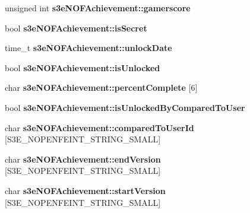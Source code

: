 \begin{DoxyCompactItemize}
\item 
\hypertarget{group___n_open_feint_api_group_ga36870064effddc6b2ff169dccd47c107}{
unsigned int {\bfseries s3eNOFAchievement::gamerscore}}
\label{group___n_open_feint_api_group_ga36870064effddc6b2ff169dccd47c107}

\item 
\hypertarget{group___n_open_feint_api_group_gabcaf8a16c837646fd6f9da16cfcefc84}{
bool {\bfseries s3eNOFAchievement::isSecret}}
\label{group___n_open_feint_api_group_gabcaf8a16c837646fd6f9da16cfcefc84}

\item 
\hypertarget{group___n_open_feint_api_group_gacc567fef5f47b21d3b268f9e8146d519}{
time\_\-t {\bfseries s3eNOFAchievement::unlockDate}}
\label{group___n_open_feint_api_group_gacc567fef5f47b21d3b268f9e8146d519}

\item 
\hypertarget{group___n_open_feint_api_group_gaf6820f91c7ca33cae0a1fc72ce166fd2}{
bool {\bfseries s3eNOFAchievement::isUnlocked}}
\label{group___n_open_feint_api_group_gaf6820f91c7ca33cae0a1fc72ce166fd2}

\item 
\hypertarget{group___n_open_feint_api_group_gad499493f971fe5430d6a06b5c70ba9d4}{
char {\bfseries s3eNOFAchievement::percentComplete} \mbox{[}6\mbox{]}}
\label{group___n_open_feint_api_group_gad499493f971fe5430d6a06b5c70ba9d4}

\item 
\hypertarget{group___n_open_feint_api_group_ga71acb5cdd5292a7b5083c326c714dcb4}{
bool {\bfseries s3eNOFAchievement::isUnlockedByComparedToUser}}
\label{group___n_open_feint_api_group_ga71acb5cdd5292a7b5083c326c714dcb4}

\item 
\hypertarget{group___n_open_feint_api_group_gaa92898686eac33f624185167d5375516}{
char {\bfseries s3eNOFAchievement::comparedToUserId} \mbox{[}S3E\_\-NOPENFEINT\_\-STRING\_\-SMALL\mbox{]}}
\label{group___n_open_feint_api_group_gaa92898686eac33f624185167d5375516}

\item 
\hypertarget{group___n_open_feint_api_group_ga8ed42d00785e6c909036c72d72a23a98}{
char {\bfseries s3eNOFAchievement::endVersion} \mbox{[}S3E\_\-NOPENFEINT\_\-STRING\_\-SMALL\mbox{]}}
\label{group___n_open_feint_api_group_ga8ed42d00785e6c909036c72d72a23a98}

\item 
\hypertarget{group___n_open_feint_api_group_ga5e75b58191771edc32ebf022277b85cd}{
char {\bfseries s3eNOFAchievement::startVersion} \mbox{[}S3E\_\-NOPENFEINT\_\-STRING\_\-SMALL\mbox{]}}
\label{group___n_open_feint_api_group_ga5e75b58191771edc32ebf022277b85cd}


\end{DoxyCompactItemize}
